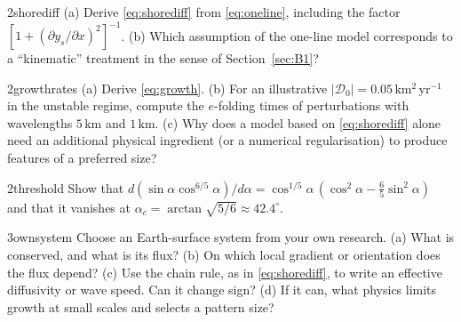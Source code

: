 \documentclass[11pt,letterpaper]{article}
\numberwithin{equation}{section}
\newcommand{\units}[1]{\,\mathrm{#1}}
\begin{document}
\begin{exercise}{2}{shorediff}
(a) Derive \eqref{eq:shorediff} from \eqref{eq:oneline}, including the factor $[1+(\partial y_s/\partial x)^2]^{-1}$.
(b) Which assumption of the one-line model corresponds to a ``kinematic'' treatment in the sense of Section~\ref{sec:B1}?
\end{exercise}

\begin{exercise}{2}{growthrates}
(a) Derive \eqref{eq:growth}.
(b) For an illustrative $|\mathcal D_0|=0.05\units{km^2\,yr^{-1}}$ in the unstable regime, compute the $e$-folding times of perturbations with
wavelengths $5\units{km}$ and $1\units{km}$.
(c) Why does a model based on \eqref{eq:shorediff} alone need an additional physical ingredient (or a numerical regularisation) to
produce features of a preferred size?
\end{exercise}

\begin{exercise}{2}{threshold}
Show that $d(\sin\alpha\cos^{6/5}\!\alpha)/d\alpha=\cos^{1/5}\!\alpha\,(\cos^2\alpha-\tfrac65\sin^2\alpha)$ and that it vanishes at
$\alpha_c=\arctan\sqrt{5/6}\approx42.4^\circ$.
\end{exercise}

\begin{exercise}{3}{ownsystem}
Choose an Earth-surface system from your own research. (a) What is conserved, and what is its flux? (b) On which local gradient or
orientation does the flux depend? (c) Use the chain rule, as in \eqref{eq:shorediff}, to write an effective diffusivity or wave speed.
Can it change sign? (d) If it can, what physics limits growth at small scales and selects a pattern size?
\end{exercise}

\clearpage
\appendix
\end{document}
